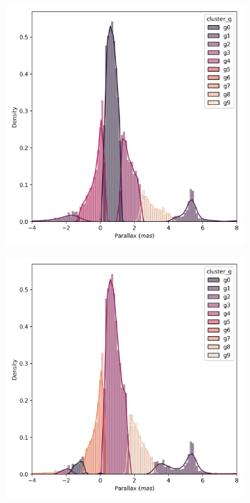 \documentclass[preprint,12pt,authoryear]{elsarticle}
\begin{document}
\begin{figure}[!hbt]
  \begin{subfigure}{0.29\textwidth}
    \includegraphics[width=\textwidth]{../figures/ngc_2632/kmeans_parallax_ngc_2632.png}
  \end{subfigure}
  \begin{subfigure}{0.29\textwidth}
    \includegraphics[width=\textwidth]{../figures/ngc_2632/dec_parallax_ngc_2632.png}

\end{subfigure}
\end{figure}
\end{document}
